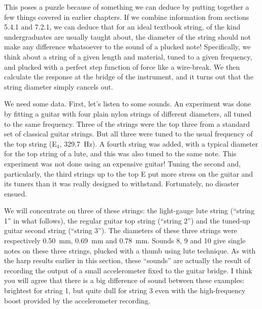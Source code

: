   This poses a puzzle because of something we can deduce by putting together a 
  few things covered in earlier chapters. If we combine information from 
  sections 5.4.1 and 7.2.1, we can deduce that for an ideal textbook string, of 
  the kind undergraduates are usually taught about, the diameter of the string 
  should not make any difference whatsoever to the sound of a plucked note! 
  Specifically, we think about a string of a given length and material, tuned 
  to a given frequency, and plucked with a perfect step function of force like 
  a wire-break. We then calculate the response at the bridge of the instrument, 
  and it turns out that the string diameter simply cancels out. 

  We need some data. First, let’s listen to some sounds. An experiment was done 
  by fitting a guitar with four plain nylon strings of different diameters, all 
  tuned to the same frequency. Three of the strings were the top three from a 
  standard set of classical guitar strings. But all three were tuned to the 
  usual frequency of the top string (E$_4$, 329.7~Hz). A fourth string was 
  added, with a typical diameter for the top string of a lute, and this was 
  also tuned to the same note. This experiment was not done using an expensive 
  guitar! Tuning the second and, particularly, the third strings up to the top 
  E put more stress on the guitar and its tuners than it was really designed to 
  withstand. Fortunately, no disaster ensued. 

  We will concentrate on three of these strings: the light-gauge lute string 
  (“string 1” in what follows), the regular guitar top string (“string 2”) and 
  the tuned-up guitar second string (“string 3”). The diameters of these three 
  strings were respectively 0.50~mm, 0.69~mm and 0.78~mm. Sounds 8, 9 and 10 
  give single notes on these three strings, plucked with a thumb using lute 
  technique. As with the harp results earlier in this section, these “sounds” 
  are actually the result of recording the output of a small accelerometer 
  fixed to the guitar bridge. I think you will agree that there is a big 
  difference of sound between these examples: brightest for string 1, but quite 
  dull for string 3 even with the high-frequency boost provided by the 
  accelerometer recording. 



